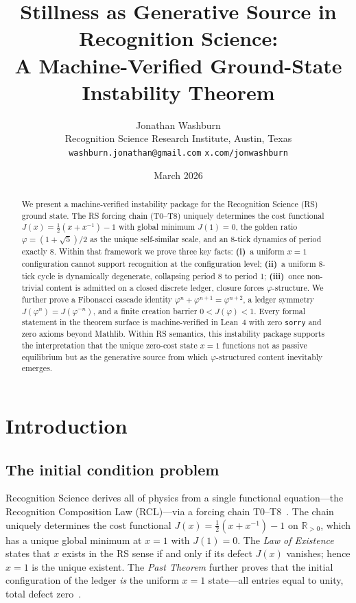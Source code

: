 \documentclass[11pt,a4paper]{article}
\title{\vspace{-1.5cm}\textbf{Stillness as Generative Source in Recognition Science:\\
A Machine-Verified Ground-State Instability Theorem}}
\author{Jonathan Washburn\\
\small Recognition Science Research Institute, Austin, Texas\\
\small \texttt{washburn.jonathan@gmail.com} \quad \texttt{x.com/jonwashburn}}
\date{March 2026}
\newcommand{\Jcost}{J}
\newcommand{\phirs}{\varphi}
\begin{document}
\maketitle

\begin{abstract}
We present a machine-verified instability package for the Recognition Science (RS) ground state.  The RS forcing chain (T0--T8) uniquely determines the cost functional $\Jcost(x)=\tfrac12(x+x^{-1})-1$ with global minimum $\Jcost(1)=0$, the golden ratio $\phirs=(1+\sqrt5)/2$ as the unique self-similar scale, and an 8-tick dynamics of period exactly 8.  Within that framework we prove three key facts: \textbf{(i)}~a uniform $x=1$ configuration cannot support recognition at the configuration level; \textbf{(ii)}~a uniform 8-tick cycle is dynamically degenerate, collapsing period 8 to period 1; \textbf{(iii)}~once non-trivial content is admitted on a closed discrete ledger, closure forces $\phirs$-structure.  We further prove a Fibonacci cascade identity $\phirs^n+\phirs^{n+1}=\phirs^{n+2}$, a ledger symmetry $\Jcost(\phirs^n)=\Jcost(\phirs^{-n})$, and a finite creation barrier $0<\Jcost(\phirs)<1$.  Every formal statement in the theorem surface is machine-verified in Lean~4 with zero \texttt{sorry} and zero axioms beyond Mathlib.  Within RS semantics, this instability package supports the interpretation that the unique zero-cost state $x=1$ functions not as passive equilibrium but as the generative source from which $\phirs$-structured content inevitably emerges.
\end{abstract}

\tableofcontents

\section{Introduction}
\label{sec:intro}

\subsection{The initial condition problem}

Recognition Science derives all of physics from a single functional equation---the Recognition Composition Law (RCL)---via a forcing chain T0--T8~\cite{RS-Axioms,RS-Published}.  The chain uniquely determines the cost functional $\Jcost(x)=\frac12(x+x^{-1})-1$ on $\mathbb R_{>0}$, which has a unique global minimum at $x=1$ with $\Jcost(1)=0$.  The \emph{Law of Existence} states that $x$ exists in the RS sense if and only if its defect $\Jcost(x)$ vanishes; hence $x=1$ is the unique existent.  The \emph{Past Theorem} further proves that the initial configuration of the ledger \emph{is} the uniform $x=1$ state---all entries equal to unity, total defect zero~\cite{RS-InitialCondition}.
\end{document}

